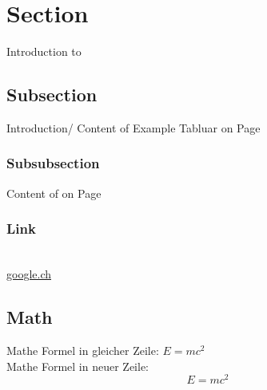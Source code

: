 

\section{Section}
\label{sec:Section}
Introduction to 

\subsection{Subsection}
\label{subsec:subsection}
Introduction/ Content of 
Example Tabluar on Page \pageref{tab:example tabular}

\subsubsection{Subsubsection}
\label{subsubsec:subsubsection}
Content of  on Page \pageref{sec:Section}

\subsubsection{Link}
 \\
\href{www.google.ch}{google.ch} %

\subsection{Math}

Mathe Formel in gleicher Zeile: $E=mc^2$\\

Mathe Formel in neuer Zeile: $$E=mc^2$$